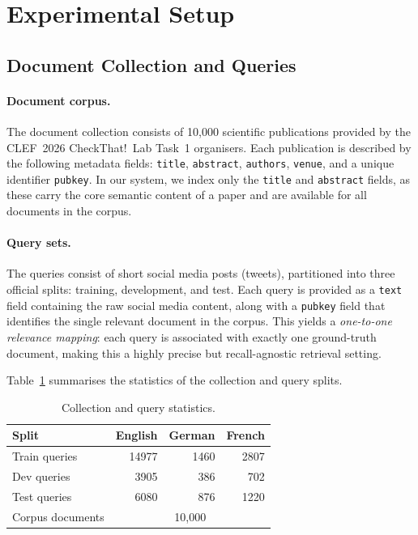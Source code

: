 \section{Experimental Setup}
\label{sec:setup}

\subsection{Document Collection and Queries}
\label{subsec:collection}

\paragraph{Document corpus.}
The document collection consists of 10{,}000 scientific publications 
provided by the CLEF~2026 CheckThat!~Lab Task~1 organisers.
Each publication is described by the following metadata fields: 
\texttt{title}, \texttt{abstract}, \texttt{authors}, \texttt{venue}, 
and a unique identifier \texttt{pubkey}.
In our system, we index only the \texttt{title} and \texttt{abstract} 
fields, as these carry the core semantic content of a paper and are 
available for all documents in the corpus.

\paragraph{Query sets.}
The queries consist of short social media posts (tweets), partitioned 
into three official splits: training, development, and test.
Each query is provided as a \texttt{text} field containing the raw 
social media content, along with a \texttt{pubkey} field that identifies 
the single relevant document in the corpus.
This yields a \textit{one-to-one relevance mapping}: each query is 
associated with exactly one ground-truth document, making this a 
highly precise but recall-agnostic retrieval setting.

Table~\ref{tab:collection} summarises the statistics of the collection 
and query splits.
\begin{table}[h]
  \caption{Collection and query statistics.}
  \label{tab:collection}
  \centering
  \begin{tabular}{lrrr}
    \toprule
    Split & English & German & French \\
    \midrule
    Train queries & 14977 & 1460 & 2807 \\
    Dev queries   & 3905 & 386 & 702 \\
    Test queries  & 6080 & 876 & 1220 \\
    \midrule
    Corpus documents & \multicolumn{3}{c}{10{,}000} \\
    \bottomrule
  \end{tabular}
\end{table}

